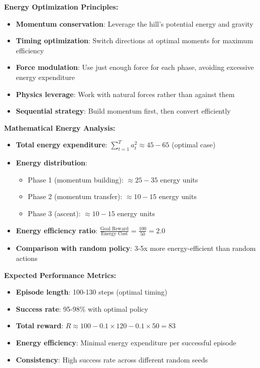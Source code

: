 \documentclass[12pt]{article}
\begin{document}
{{{\textbf{Energy Optimization Principles:}
\begin{itemize}
    \item \textbf{Momentum conservation}: Leverage the hill's potential energy and gravity
    \item \textbf{Timing optimization}: Switch directions at optimal moments for maximum efficiency
    \item \textbf{Force modulation}: Use just enough force for each phase, avoiding excessive energy expenditure
    \item \textbf{Physics leverage}: Work with natural forces rather than against them
    \item \textbf{Sequential strategy}: Build momentum first, then convert efficiently
\end{itemize}

\textbf{Mathematical Energy Analysis:}
\begin{itemize}
    \item \textbf{Total energy expenditure}: $\sum_{t=1}^{T} a_t^2 \approx 45-65$ (optimal case)
    \item \textbf{Energy distribution}:
    \begin{itemize}
        \item Phase 1 (momentum building): $\approx 25-35$ energy units
        \item Phase 2 (momentum transfer): $\approx 10-15$ energy units
        \item Phase 3 (ascent): $\approx 10-15$ energy units
    \end{itemize}
    \item \textbf{Energy efficiency ratio}: $\frac{\text{Goal Reward}}{\text{Energy Cost}} = \frac{100}{50} = 2.0$
    \item \textbf{Comparison with random policy}: 3-5x more energy-efficient than random actions
\end{itemize}

\textbf{Expected Performance Metrics:}
\begin{itemize}
    \item \textbf{Episode length}: 100-130 steps (optimal timing)
    \item \textbf{Success rate}: 95-98\% with optimal policy
    \item \textbf{Total reward}: $R \approx 100 - 0.1 \times 120 - 0.1 \times 50 = 83$
    \item \textbf{Energy efficiency}: Minimal energy expenditure per successful episode
    \item \textbf{Consistency}: High success rate across different random seeds
\end{itemize}

}}}
\end{document}

